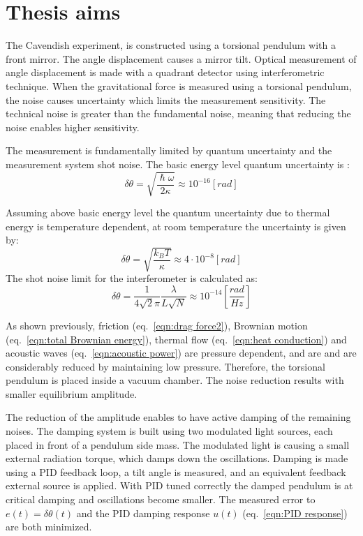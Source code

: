 \documentclass[\main/master.tex]{subfiles}
\begin{document}
\newspacing
\chapter{Thesis aims}\label{chapter:Thesis aims}

The Cavendish experiment, is constructed using a torsional pendulum with a front mirror. The angle displacement causes a mirror tilt. Optical measurement of angle displacement is made with a quadrant detector using interferometric technique. When the gravitational force is measured using a torsional pendulum, the noise causes uncertainty which limits the measurement sensitivity. The technical noise is greater than the fundamental noise, meaning that reducing the noise enables higher sensitivity.
\par\noindent
The measurement is fundamentally limited by quantum uncertainty and the measurement system shot noise. The basic energy level quantum uncertainty is \cite{howell2019}:
\begin{equation}
\delta\theta= \sqrt{\frac{\hslash\omega}{2\kappa}} \approx 10^{-16} [rad]    \label{eqn:basic uncertainty}
\end{equation}
\par\noindent
Assuming above basic energy level the quantum uncertainty due to thermal energy is temperature dependent, at room temperature the uncertainty is given by:
\begin{equation}
\delta\theta = \sqrt{\frac{k_B T}{\kappa}} \approx 4\cdot 10^{-8} [rad] \label{eqn:Brownian uncertainty 3}
\end{equation}
The shot noise limit for the interferometer is calculated as:
\begin{equation}
\delta\theta = \frac{1}{4\sqrt{2}\pi}\frac{\lambda}{L\sqrt{N}} \approx
10^{-14} [\frac{rad}{Hz}]    \label{eqn:shot limit}
\end{equation}
\par\noindent
As shown previously, friction (eq.~\ref{eqn:drag force2}), Brownian motion (eq.~\ref{eqn:total Brownian energy}), thermal flow (eq.~\ref{eqn:heat conduction}) and acoustic waves (eq.~\ref{eqn:acoustic power}) are pressure dependent, and are and are considerably reduced by maintaining low pressure. Therefore, the torsional pendulum is placed inside a vacuum chamber. The noise reduction results with smaller equilibrium amplitude.
\par\noindent
The reduction of the amplitude enables to have active damping of the remaining noises. The damping system is built using two modulated light sources, each placed in front of a pendulum side mass. The modulated light is causing a small external radiation torque, which damps down the oscillations. Damping is made using a PID feedback loop, a tilt angle is measured, and an equivalent feedback external source is applied. With PID tuned correctly the damped pendulum is at critical damping and oscillations become smaller. The measured error to $e(t) = \delta\theta(t)$ and the PID damping response $u(t)$ (eq.~\ref{eqn:PID response}) are both minimized. 
\end{document}
